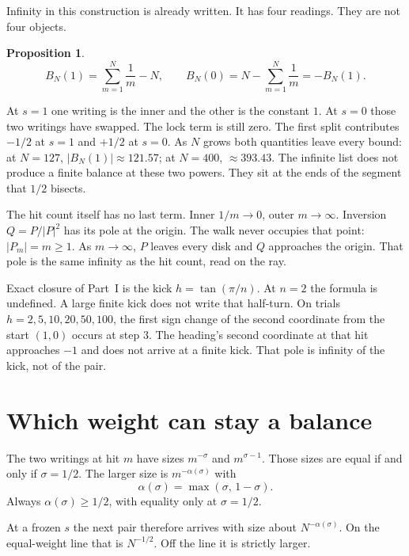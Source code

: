 \documentclass[10pt,a4paper]{article}
\theoremstyle{plain}
\newtheorem{proposition}{Proposition}
\theoremstyle{definition}
\theoremstyle{remark}
\begin{document}
Infinity in this construction is already written. It has four readings. They are not four objects.

\begin{proposition}
\[
B_N(1)=\sum_{m=1}^{N}\frac1m - N,\qquad
B_N(0)=N-\sum_{m=1}^{N}\frac1m=-B_N(1).
\]
\end{proposition}

At \(s=1\) one writing is the inner and the other is the constant \(1\).
At \(s=0\) those two writings have swapped.
The lock term is still zero.
The first split contributes \(-1/2\) at \(s=1\) and \(+1/2\) at \(s=0\).
As \(N\) grows both quantities leave every bound: at \(N=127\), \(\lvert B_N(1)\rvert\approx 121.57\); at \(N=400\), \(\approx 393.43\).
The infinite list does not produce a finite balance at these two powers.
They sit at the ends of the segment that \(1/2\) bisects.

The hit count itself has no last term.
Inner \(1/m\to 0\), outer \(m\to\infty\).
Inversion \(Q=P/|P|^2\) has its pole at the origin.
The walk never occupies that point: \(\lvert P_m\rvert=m\ge 1\).
As \(m\to\infty\), \(P\) leaves every disk and \(Q\) approaches the origin.
That pole is the same infinity as the hit count, read on the ray.

Exact closure of Part~I is the kick \(h=\tan(\pi/n)\).
At \(n=2\) the formula is undefined.
A large finite kick does not write that half-turn.
On trials \(h=2,5,10,20,50,100\), the first sign change of the second coordinate from the start \((1,0)\) occurs at step \(3\).
The heading's second coordinate at that hit approaches \(-1\) and does not arrive at a finite kick.
That pole is infinity of the kick, not of the pair.

\section{Which weight can stay a balance}

The two writings at hit \(m\) have sizes \(m^{-\sigma}\) and \(m^{\sigma-1}\).
Those sizes are equal if and only if \(\sigma=1/2\).
The larger size is \(m^{-\alpha(\sigma)}\) with
\[
\alpha(\sigma)=\max(\sigma,\,1-\sigma).
\]
Always \(\alpha(\sigma)\ge 1/2\), with equality only at \(\sigma=1/2\).

At a frozen \(s\) the next pair therefore arrives with size about \(N^{-\alpha(\sigma)}\).
On the equal-weight line that is \(N^{-1/2}\).
Off the line it is strictly larger.
\end{document}
